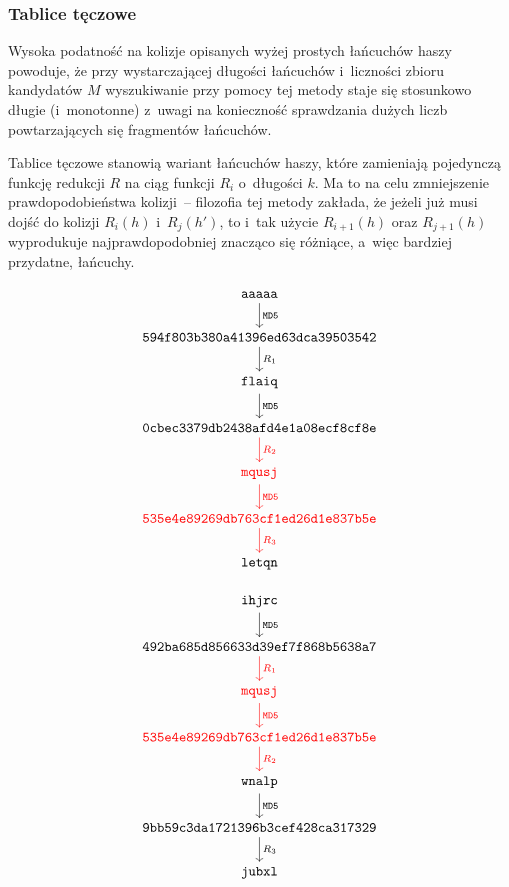\subsubsection{Tablice tęczowe}
Wysoka podatność na kolizje opisanych wyżej prostych łańcuchów haszy
powoduje, że przy wystarczającej długości łańcuchów i~liczności zbioru
kandydatów $M$ wyszukiwanie przy pomocy tej metody staje się stosunkowo
długie (i~monotonne) z~uwagi na konieczność sprawdzania dużych liczb
powtarzających się fragmentów łańcuchów.

Tablice tęczowe stanowią wariant łańcuchów haszy, które zamieniają pojedynczą
funkcję redukcji $R$ na ciąg funkcji $R_i$ o~długości $k$. Ma to na celu
zmniejszenie prawdopodobieństwa kolizji~-- filozofia tej metody zakłada, że
jeżeli już musi dojść do kolizji $R_i(h)$ i~$R_j(h')$, to i~tak użycie
$R_{i+1}(h)$ oraz $R_{j+1}(h)$ wyprodukuje najprawdopodobniej znacząco się
różniące, a~więc bardziej przydatne, łańcuchy.

\begin{multicols}{2}
    \[
    \begin{tikzcd}
        \mathtt{aaaaa} \arrow{d}{\mathtt{MD5}} \\
        \mathtt{594f803b380a41396ed63dca39503542} \arrow{d}{R_1} \\
        \mathtt{flaiq} \arrow{d}{\mathtt{MD5}} \\
        \mathtt{0cbec3379db2438afd4e1a08ecf8cf8e} \arrow[color=red]{d}{R_2} \\
        \mathtt{\textcolor{red}{mqusj}} \arrow[color=red]{d}{\mathtt{MD5}} \\
        \mathtt{\textcolor{red}{535e4e89269db763cf1ed26d1e837b5e}} \arrow[color=red]{d}{R_3} \\
        \mathtt{letqn}
    \end{tikzcd}
    \]

\columnbreak

    \[
    \begin{tikzcd}
        \mathtt{ihjrc} \arrow{d}{\mathtt{MD5}} \\
        \mathtt{492ba685d856633d39ef7f868b5638a7} \arrow[color=red]{d}{R_1} \\
        \mathtt{\textcolor{red}{mqusj}} \arrow[color=red]{d}{\mathtt{MD5}} \\
        \mathtt{\textcolor{red}{535e4e89269db763cf1ed26d1e837b5e}} \arrow[color=red]{d}{R_2} \\
        \mathtt{wnalp} \arrow{d}{\mathtt{MD5}} \\
        \mathtt{9bb59c3da1721396b3cef428ca317329} \arrow{d}{R_3} \\
        \mathtt{jubxl}
    \end{tikzcd}
    \]
\end{multicols}

